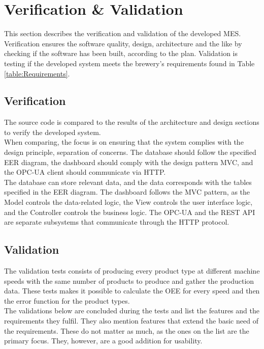 \section{Verification \& Validation}
This section describes the verification and validation of the developed MES.\\

Verification ensures the software quality, design, architecture and the like by
checking if the software has been built, according to the plan. Validation is
testing if the developed system meets the brewery's requirements found in Table
\ref{table:Requirements}.

\subsection{Verification}
The source code is compared to the results of the architecture and design
sections to verify the developed system. \\

When comparing, the focus is on ensuring that the system complies with the
design principle, separation of concerns. The database should follow the
specified EER diagram, the dashboard should comply with the design pattern MVC,
and the OPC-UA client should communicate via HTTP. \\

The database can store relevant data, and the data corresponds with the tables
specified in the EER diagram. The dashboard follows the MVC pattern, as the
Model controls the data-related logic, the View controls the user interface
logic, and the Controller controls the business logic. The OPC-UA and the REST
API are separate subsystems that communicate through the HTTP protocol. 


\subsection{Validation}
The validation tests consists of producing every product type at different
machine speeds with the same number of products to produce and gather the
production data. These tests makes it possible to calculate the OEE for every
speed and then the error function for the product types.\\

The validations below are concluded during the tests and list the features and
the requirements they fulfil. They also mention features that extend the basic
need of the requirements. These do not matter as much, as the ones on the list
are the primary focus. They, however, are a good addition for usability.

